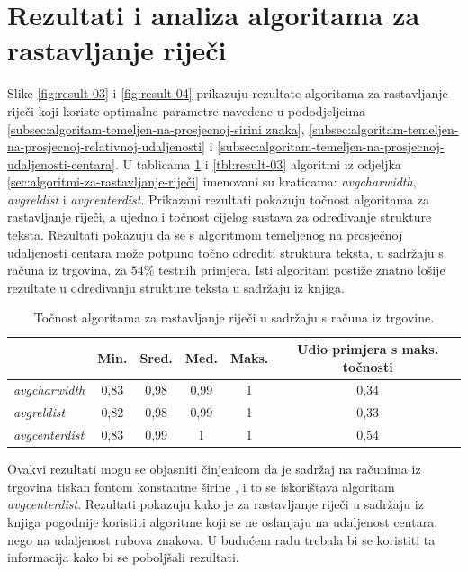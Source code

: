 \documentclass[times, utf8, zavrsni]{fer}
\begin{document}
\pagebreak







\section{Rezultati i analiza algoritama za rastavljanje riječi}
\label{sec:rezultati-i-analiza-algoritama-za-rastavljanje-rijeci}
Slike \ref{fig:result-03} i \ref{fig:result-04} prikazuju rezultate algoritama
za rastavljanje riječi koji koriste optimalne parametre navedene u
pododjeljcima \ref{subsec:algoritam-temeljen-na-prosjecnoj-sirini znaka},
\ref{subsec:algoritam-temeljen-na-prosjecnoj-relativnoj-udaljenosti} i
\ref{subsec:algoritam-temeljen-na-prosjecnoj-udaljenosti-centara}. U tablicama
\ref{tbl:result-02} i \ref{tbl:result-03} algoritmi iz odjeljka
\ref{sec:algoritmi-za-rastavljanje-riječi} imenovani su kraticama:
\emph{avgcharwidth}, \emph{avgreldist} i \emph{avgcenterdist}. Prikazani
rezultati pokazuju točnost algoritama za rastavljanje riječi, a ujedno i
točnost cijelog sustava za određivanje strukture teksta.
Rezultati pokazuju da se s algoritmom temeljenog na prosječnoj udaljenosti
centara može potpuno točno odrediti struktura teksta, u sadržaju s računa iz
trgovina, za $54\%$ testnih primjera. Isti algoritam postiže znatno lošije
rezultate u određivanju strukture teksta u sadržaju iz knjiga.

\begin{table}[htb]
\caption{
    Točnost algoritama za rastavljanje riječi u sadržaju s računa iz trgovine.
}
\label{tbl:result-02}
\centering
\begin{tabular}{lccccc} \hline
& Min. & Sred. & Med. & Maks. & Udio primjera s maks. točnosti \\ \hline
\emph{avgcharwidth} & 0,83 & 0,98 & 0,99 & 1 & 0,34 \\
\emph{avgreldist} & 0,82 & 0,98 & 0,99 & 1 & 0,33 \\
\emph{avgcenterdist} & 0,83 & 0,99 & 1 & 1 & 0,54 \\ \hline
\end{tabular}
\end{table}

Ovakvi rezultati
mogu se objasniti činjenicom da je sadržaj na računima iz trgovina tiskan
fontom konstantne širine , i to se iskorištava algoritam
\emph{avgcenterdist}. Rezultati pokazuju kako je za rastavljanje riječi u
sadržaju iz knjiga pogodnije koristiti algoritme koji se ne oslanjaju na
udaljenost centara, nego na udaljenost rubova znakova. U budućem radu trebala
bi se koristiti ta informacija kako bi se poboljšali rezultati.
\end{document}

